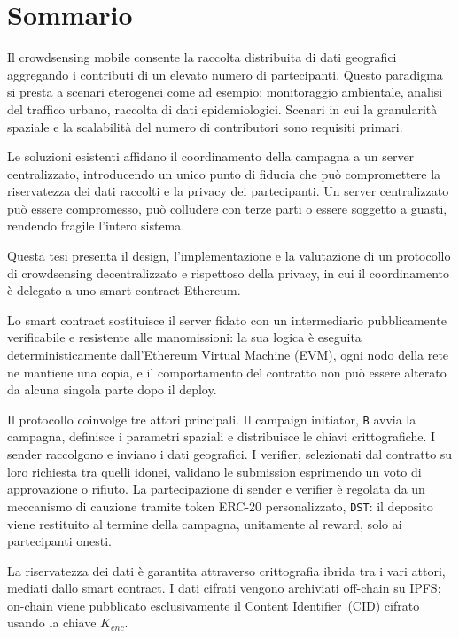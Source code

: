 \topmargin=-1cm
\chapter*{Sommario}
Il crowdsensing mobile consente la raccolta distribuita di dati
geografici aggregando i contributi di un elevato numero di
partecipanti.
Questo paradigma si presta a scenari eterogenei come ad esempio: monitoraggio
ambientale, analisi del traffico urbano, raccolta di dati
epidemiologici.
Scenari in cui la granularità spaziale e la scalabilità
del numero di contributori sono requisiti primari.


Le soluzioni esistenti affidano il coordinamento della campagna a
un server centralizzato, introducendo un unico punto di fiducia
che può compromettere la riservatezza dei dati raccolti e la
privacy dei partecipanti.
Un server centralizzato può essere compromesso, può colludere con
terze parti o essere soggetto a guasti, rendendo fragile l'intero
sistema.

Questa tesi presenta il design, l'implementazione e la valutazione
di un protocollo di crowdsensing decentralizzato e rispettoso della
privacy, in cui il coordinamento è delegato a uno smart contract
Ethereum.


Lo smart contract sostituisce il server fidato con un intermediario
pubblicamente verificabile e resistente alle manomissioni: la sua
logica è eseguita deterministicamente dall'Ethereum Virtual
Machine (EVM), ogni nodo della rete ne mantiene una copia, e il
comportamento del contratto non può essere alterato da alcuna
singola parte dopo il deploy.

Il protocollo coinvolge tre attori principali.
Il campaign initiator, \texttt{B} avvia la campagna, definisce i parametri
spaziali e distribuisce le chiavi crittografiche.
I sender raccolgono e inviano i dati geografici.
I verifier, selezionati dal contratto su loro richiesta tra quelli idonei, validano le
submission esprimendo un voto di approvazione o rifiuto.
La partecipazione di sender e verifier è regolata da un meccanismo
di cauzione tramite token ERC-20 personalizzato, \texttt{DST}: il deposito
viene restituito al termine della campagna, unitamente al reward,
solo ai partecipanti onesti.

La riservatezza dei dati è garantita attraverso crittografia ibrida tra i vari attori, mediati dallo smart contract.
I dati cifrati vengono archiviati off-chain su IPFS; on-chain viene
pubblicato esclusivamente il Content Identifier~(CID) cifrato usando la chiave $K_{enc}$.

